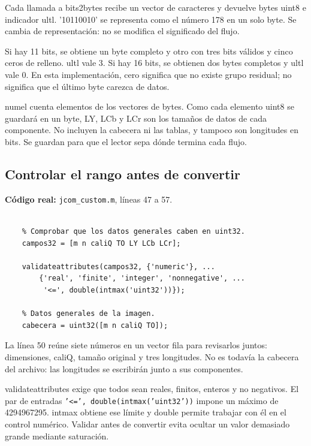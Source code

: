 \documentclass[11pt,a4paper,oneside]{report}
\begin{document}
Cada llamada a bits2bytes recibe un vector de caracteres y devuelve bytes
uint8 e indicador ultl. '10110010' se representa como el número 178 en un
solo byte. Se cambia de representación: no se modifica el significado del flujo.

Si hay 11 bits, se obtiene un byte completo y otro con tres bits válidos
y cinco ceros de relleno. ultl vale 3. Si hay 16 bits, se obtienen dos bytes
completos y ultl vale 0. En esta implementación, cero significa que no existe
grupo residual; no significa que el último byte carezca de datos.

numel cuenta elementos de los vectores de bytes. Como cada elemento uint8
se guardará en un byte, LY, LCb y LCr son los tamaños de datos de cada componente.
No incluyen la cabecera ni las tablas, y tampoco son longitudes en bits.
Se guardan para que el lector sepa dónde termina cada flujo.


\par\medskip\noindent\begin{minipage}{\linewidth}

\subsection{Controlar el rango antes de convertir}

\textbf{Código real:} \texttt{jcom\_custom.m}, líneas 47 a 57.

\begin{lstlisting}[firstnumber=47]
    % PASO 8: preparar la cabecera y las especificaciones Huffman.

    % Comprobar que los datos generales caben en uint32.
    campos32 = [m n caliQ TO LY LCb LCr];

    validateattributes(campos32, {'numeric'}, ...
        {'real', 'finite', 'integer', 'nonnegative', ...
         '<=', double(intmax('uint32'))});

    % Datos generales de la imagen.
    cabecera = uint32([m n caliQ TO]);
\end{lstlisting}

\end{minipage}\par


La línea 50 reúne siete números en un vector fila para revisarlos juntos:
dimensiones, caliQ, tamaño original y tres longitudes. No es todavía la
cabecera del archivo: las longitudes se escribirán junto a sus componentes.

validateattributes exige que todos sean reales, finitos, enteros y no negativos.
El par de entradas \texttt{'<=', double(intmax('uint32'))} impone un máximo
de 4294967295. intmax obtiene ese límite y double permite trabajar con él
en el control numérico. Validar antes de convertir evita ocultar un valor
demasiado grande mediante saturación.
\end{document}
